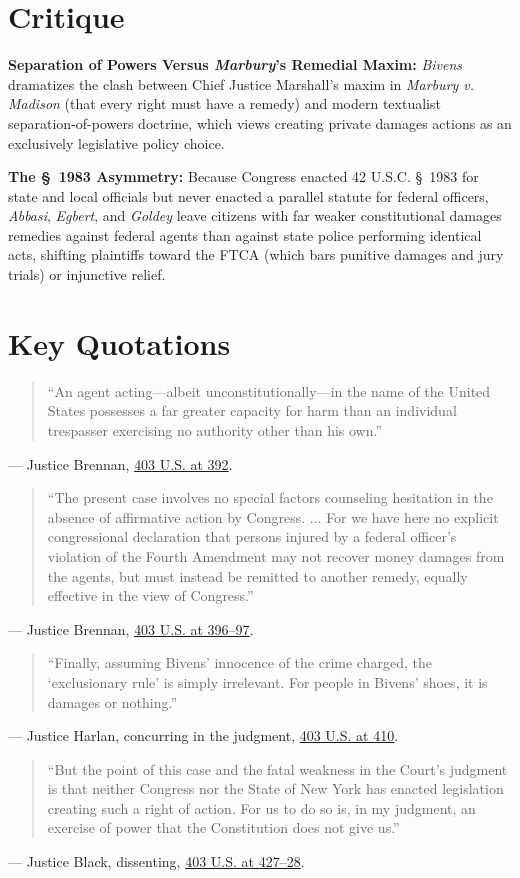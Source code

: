 \documentclass[12pt]{article}
\begin{document}
\section{Critique}
\textbf{Separation of Powers Versus \textit{Marbury}'s Remedial Maxim:} \textit{Bivens} dramatizes the clash between Chief Justice Marshall's maxim in \textit{Marbury v. Madison} (that every right must have a remedy) and modern textualist separation-of-powers doctrine, which views creating private damages actions as an exclusively legislative policy choice.

\textbf{The \S~1983 Asymmetry:} Because Congress enacted 42 U.S.C. \S~1983 for state and local officials but never enacted a parallel statute for federal officers, \textit{Abbasi}, \textit{Egbert}, and \textit{Goldey} leave citizens with far weaker constitutional damages remedies against federal agents than against state police performing identical acts, shifting plaintiffs toward the FTCA (which bars punitive damages and jury trials) or injunctive relief.

\section{Key Quotations}
\begin{quote}
``An agent acting---albeit unconstitutionally---in the name of the United States possesses a far greater capacity for harm than an individual trespasser exercising no authority other than his own.''
\end{quote}
\noindent --- Justice Brennan, \href{https://supreme.justia.com/cases/federal/us/403/388/}{403 U.S. at 392}.

\begin{quote}
``The present case involves no special factors counseling hesitation in the absence of affirmative action by Congress. ... For we have here no explicit congressional declaration that persons injured by a federal officer's violation of the Fourth Amendment may not recover money damages from the agents, but must instead be remitted to another remedy, equally effective in the view of Congress.''
\end{quote}
\noindent --- Justice Brennan, \href{https://supreme.justia.com/cases/federal/us/403/388/}{403 U.S. at 396--97}.

\begin{quote}
``Finally, assuming Bivens' innocence of the crime charged, the `exclusionary rule' is simply irrelevant. For people in Bivens' shoes, it is damages or nothing.''
\end{quote}
\noindent --- Justice Harlan, concurring in the judgment, \href{https://supreme.justia.com/cases/federal/us/403/388/}{403 U.S. at 410}.

\begin{quote}
``But the point of this case and the fatal weakness in the Court's judgment is that neither Congress nor the State of New York has enacted legislation creating such a right of action. For us to do so is, in my judgment, an exercise of power that the Constitution does not give us.''
\end{quote}
\noindent --- Justice Black, dissenting, \href{https://supreme.justia.com/cases/federal/us/403/388/}{403 U.S. at 427--28}.
\end{document}
